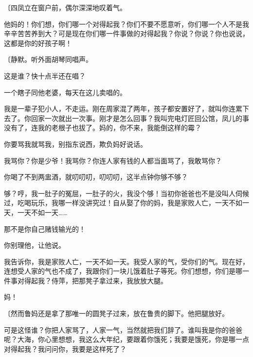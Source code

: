 {\fangsong〔四凤立在窗户前，偶尔深深地叹着气。}

他妈的！你们想，你们哪一个对得起我？你们不要不愿意听，你们哪一个人不是我辛辛苦苦养到大？可是现在你们哪一件事做的对得起我？你说？你说？你也说说，这都是你的好孩子啊！

{\fangsong〔静默。听外面胡琴同唱声。}

这是谁？快十点半还在唱？

一个瞎子同他老婆，每天在这儿卖唱的。

我是一辈子犯小人，不走运。刚在周家混了两年，孩子都安置好了，就叫你连累下去了。你回家一次就出一次事。刚才是怎么回事？我叫完电灯匠回公馆，凤儿的事没有了，连我的老根子也拔了。妈的，你不来，我能倒这样的霉？

你要骂我就骂我，别指东说西，欺负妈好说话。

我骂你？你是少爷！我骂你？你连人家有钱的人都当面骂了，我敢骂你？

你喝了不到两盅酒，就叨叨叨，叨叨叨，这半点钟你够不够？

够？哼，我一肚子的冤屈，一肚子的火，我没个够！当初你爸爸也不是没叫人伺候过，吃喝玩乐，我哪一样没讲究过！自从娶了你的妈，我是家败人亡，一天不如一天，一天不如一天……

那不是你自己赌钱输光的！

你别理他，让他说。

我告诉你，我是家败人亡，一天不如一天。我受人家的气，受你们的气。现在好，连想受人家的气也不成了，我跟你们一块儿饿着肚子等死。你们想想，你们是哪一件事对得起我？侍萍，把那凳子拿过来，我放放大腿。

妈！

{\fangsong〔然而鲁妈还是拿了那唯一的圆凳子过来，放在鲁贵的脚下。他把腿放好。}

可是这怪谁？你把人家骂了，人家一气，当然就把我们辞了。谁叫我是你的爸爸呢？大海，你心里想想，我这么大年纪，要跟着你饿死；我要是饿死，你是哪一点对得起我？我问问你，我要是这样死了？

